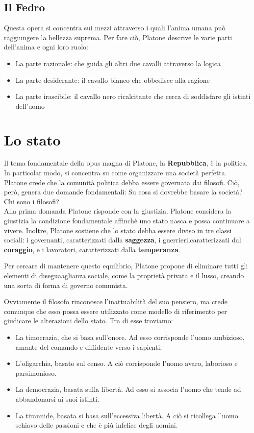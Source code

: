 \documentclass[10pt,a4paper]{article}
\begin{document}
	 \subsection{Il Fedro}

	 Questa opera si concentra sui mezzi attraverso i quali l'anima umana può raggiungere la bellezza suprema. Per fare ciò, Platone descrive le varie parti dell'anima e ogni loro ruolo:
	 \begin{itemize}
	 	\item La parte razionale: che guida gli altri due cavalli attraverso la logica
		\item La parte desiderante: il cavallo bianco che obbedisce alla ragione
		\item La parte irascibile: il cavallo nero ricalcitante che cerca di soddisfare gli istinti dell'uomo
	 \end{itemize}

	 \section{Lo stato}

	 Il tema fondamentale della opus magna di Platone, la \textbf{Repubblica}, è la politica. In particolar modo, si concentra su come organizzare una società perfetta.
	 Platone crede che la comunità politica debba essere governata dai filosofi. Ciò, però, genera due domande fondamentali: Su cosa si dovrebbe basare la società? Chi sono i filosofi?\\

	 Alla prima domanda Platone risponde con la giustizia. Platone considera la giustizia la condizione fondamentale affinchè uno stato nasca e possa continuare a vivere. Inoltre, Platone sostiene che lo stato debba essere diviso in tre classi sociali: i governanti, caratterizzati dalla \textbf{saggezza}, i guerrieri,caratterizzati dal \textbf{coraggio}, e i lavoratori, caratterizzati dalla \textbf{temperanza}.

	 Per cercare di mantenere questo equilibrio, Platone propone di eliminare tutti gli elementi di diseguaaglianza sociale, come la proprietà privata e il lusso, creando una sorta di forma di governo comunista.

	 Ovviamente il filosofo rinconosce l'inattuabilità del suo pensiero, ma crede comunque che esso possa essere utilizzato come modello di riferimento per giudicare le alterazioni dello stato. Tra di esse troviamo:
	 \begin{itemize}
	 	\item La timocrazia, che si basa sull'onore. Ad esso corrisponde l'uomo ambizioso, amante del comando e diffidente verso i sapienti.
		\item L'oligarchia, basato sul censo. A ciò corrisponde l'uomo avaro, laborioso e parsimonioso.
		\item La democrazia, basata sulla libertà. Ad esso si associa l'uomo che tende ad abbandonarsi ai suoi istinti.
		\item La tirannide, basata si basa sull'eccessiva libertà. A ciò si ricollega l'uomo schiavo delle passioni e che è più infelice degli uomini.
	 \end{itemize}
\end{document}
